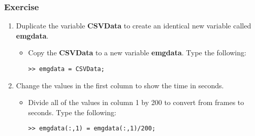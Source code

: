 \documentclass[12pt,a4paper]{article}
\begin{document}
\subsubsection*{Exercise}
\begin{enumerate}
	\item Duplicate the variable \textbf{CSVData} to create an identical new variable called \textbf{emgdata}.
	\begin{itemize}
		\item Copy the \textbf{CSVData} to a new variable \textbf{emgdata}.  Type the following:
		\begin{lstlisting}[style=Matlab-editor]
>> emgdata = CSVData;
		\end{lstlisting}		
	\end{itemize}
	
	\item Change the values in the first column to show the time in seconds.	
	\begin{itemize}
		\item Divide all of the values in column 1 by 200 to convert from frames to seconds. Type the following:
		\begin{lstlisting}[style=Matlab-editor]
>> emgdata(:,1) = emgdata(:,1)/200;
		\end{lstlisting}		
	\end{itemize}	
	

\end{enumerate}
\end{document}
